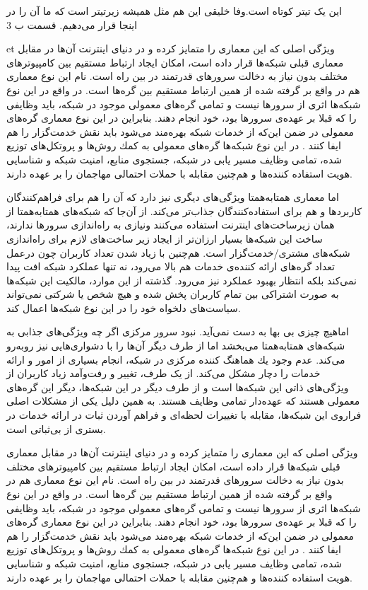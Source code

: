 \documentclass[12pt,twoside]{xepersian-magazine}
\begin{document}
\begin{article}{2}
{این یک تیتر کوتاه است.وفا خلیقی}
{این هم مثل همیشه زیرتیتر است که ما آن را در اینجا قرار می‌دهیم.}
{قسمت ب}
{3}


\noindent{}  et ويژگی اصلی که اين معماری را متمايز کرده و در دنيای اينترنت آن‌ها در مقابل معماری قبلی شبكه‌ها قرار داده است، امكان ايجاد ارتباط مستقيم  بين كامپيوترهای مختلف بدون نياز به دخالت سرورهای قدرتمند در بين راه است.  نام‌ اين نوع معماری هم در واقع بر گرفته شده از همین  ارتباط مستقیم بين گره‌ها است.  در واقع در اين نوع شبكه‌ها اثری از سرورها نيست و تمامی گره‌های معمولی موجود در شبكه، بايد وظايفی را که قبلا بر عهده‌ی سرورها بود، خود انجام دهند. بنابراين در اين نوع معماری گره‌های معمولی در ضمن اين‌که از خدمات شبکه بهره‌مند می‌شود بايد نقش خدمت‌گزار را هم ايفا کنند . در اين نوع شبکه‌ها گره‌های معمولی به كمك روش‌ها و پروتكل‌های توزيع شده، تمامی وظايف  مسير يابی در شبكه، جستجوی منابع، امنيت شبكه و شناسايی هويت استفاده كننده‌ها و هم‌چنين مقابله با حملات احتمالی مهاجمان را بر عهده دارند.

اما معماری همتابه‌همتا ويژگی‌های ديگری نيز دارد که آن را هم برای فراهم‌کنندگان کاربردها و هم برای استفاده‌کنندگان جذاب‌تر می‌کند.  از آن‌جا که شبکه‌های همتابه‌همتا از همان زيرساخت‌های اينترنت استفاده می‌کنند ونيازی به راه‌اندازی سرورها ندارند، ساخت اين شبكه‌ها بسيار ارزان‌تر از ايجاد زير ساخت‌های لازم برای راه‌اندازی شبكه‌های مشتری/خدمت‌گزار است.  هم‌چنين با زياد شدن تعداد کاربران چون درعمل تعداد گره‌های ارائه کننده‌ی خدمات هم بالا می‌رود، نه تنها عملكرد شبكه افت پيدا نمی‌كند بلكه انتظار بهبود عملکرد نيز می‌رود. گذشته از اين موارد، مالكيت اين شبكه‌ها به صورت اشتراكی بين تمام کاربران پخش شده و هيچ شخص يا شركتی نمی‌تواند سياست‌های دلخواه خود را در اين نوع شبكه‌ها اعمال کند.

اماهيچ چيزی بی‌ بها به دست نمی‌آید. نبود سرور مرکزی اگر چه  ويژگی‌های جذابی به شبکه‌های همتابه‌همتا می‌بخشد اما از طرف ديگر آن‌ها را با دشواری‌هايی نيز روبه‌رو می‌کند.  عدم وجود يك هماهنگ كننده مركزی در شبكه، انجام بسياری از امور و ارائه خدمات را  دچار مشكل می‌کند.  از يک طرف، تغيير و رفت‌وآمد زیاد کاربران از ويژگی‌های ذاتی اين شبکه‌ها است و از طرف ديگر در اين شبكه‌ها، ديگر اين گره‌های معمولی  هستند كه  عهده‌دار تمامی وظايف هستند. به همين دلیل يکی از مشکلات اصلی فراروی اين شبكه‌ها، مقابله با  تغييرات لحظه‌ای و فراهم آوردن ثبات در ارائه  خدمات در بستری از بی‌ثباتی است.

ويژگی اصلی که اين معماری را متمايز کرده و در دنيای اينترنت آن‌ها در مقابل معماری قبلی شبكه‌ها قرار داده است، امكان ايجاد ارتباط مستقيم  بين كامپيوترهای مختلف بدون نياز به دخالت سرورهای قدرتمند در بين راه است.  نام‌ اين نوع معماری هم در واقع بر گرفته شده از همین  ارتباط مستقیم بين گره‌ها است.  در واقع در اين نوع شبكه‌ها اثری از سرورها نيست و تمامی گره‌های معمولی موجود در شبكه، بايد وظايفی را که قبلا بر عهده‌ی سرورها بود، خود انجام دهند. بنابراين در اين نوع معماری گره‌های معمولی در ضمن اين‌که از خدمات شبکه بهره‌مند می‌شود بايد نقش خدمت‌گزار را هم ايفا کنند . در اين نوع شبکه‌ها گره‌های معمولی به كمك روش‌ها و پروتكل‌های توزيع شده، تمامی وظايف  مسير يابی در شبكه، جستجوی منابع، امنيت شبكه و شناسايی هويت استفاده كننده‌ها و هم‌چنين مقابله با حملات احتمالی مهاجمان را بر عهده دارند.


\end{article}
\end{document}
